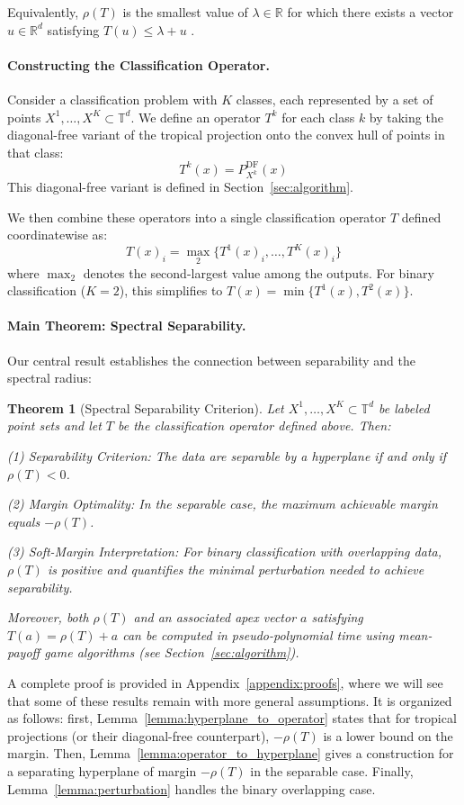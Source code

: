\documentclass{article}
\newtheorem{theorem}{Theorem}
\newcommand{\R}{\mathbb{R}}
\newcommand{\trop}{\mathbb{T}}
\begin{document}
Equivalently, $\rho(T)$ is the smallest value of $\lambda\in \R$ for which there exists a vector $u\in\R^d$
satisfying $T(u) \leq \lambda + u$ \cite{nussbaum1986,AGGut10,akiangaubertqisaadi}.

\paragraph{Constructing the Classification Operator.}
Consider a classification problem with $K$ classes, each represented by a set of points $X^1,\dots,X^K \subset \trop^d$. We define an operator $T^k$ for each class $k$ by taking the diagonal-free variant of the tropical projection onto the convex hull of points in that class:
\[
T^k(x) = P_{X^k}^{\text{DF}}(x)
\]
This diagonal-free variant is defined in Section~\ref{sec:algorithm}.

We then combine these operators into a single classification operator $T$ defined coordinatewise as:
\[
T(x)_i = \operatorname{\max}_2\{T^1(x)_i, \dots, T^K(x)_i\}\label{eq:single_operator}
\]
where $\operatorname{\max}_2$ denotes the second-largest value among the outputs. For binary classification ($K=2$), this simplifies to $T(x)=\min\{T^1(x), T^2(x)\}$.

\paragraph{Main Theorem: Spectral Separability.}
Our central result establishes the connection between separability and the spectral radius:
\begin{theorem}[Spectral Separability Criterion]\label{thm:spectral_separability}
Let $X^1,\ldots,X^K \subset \trop^d$ be labeled point sets and let $T$ be the classification operator defined above. Then:

(1) \textit{Separability Criterion:} The data are separable by a hyperplane if and only if $\rho(T) < 0$.

(2) \textit{Margin Optimality:} In the separable case, the maximum achievable margin equals $-\rho(T)$.

(3) \textit{Soft-Margin Interpretation:} For binary classification with overlapping data, $\rho(T)$ is positive and quantifies the minimal perturbation needed to achieve separability.

Moreover, both $\rho(T)$ and an associated apex vector $a$ satisfying $T(a) = \rho(T)+a$ can be computed in pseudo-polynomial time using mean-payoff game algorithms (see Section~\ref{sec:algorithm}).
\end{theorem}
A complete proof is provided in Appendix~\ref{appendix:proofs}, where we will see that some of these results remain with more general assumptions.
It is organized as follows: first, Lemma~\ref{lemma:hyperplane_to_operator} states that for tropical projections (or their diagonal-free counterpart), $-\rho(T)$ is a lower bound on the margin.
Then, Lemma~\ref{lemma:operator_to_hyperplane} gives a construction for a separating hyperplane of margin $-\rho(T)$ in the separable case. Finally, Lemma~\ref{lemma:perturbation} handles the binary overlapping case.
\end{document}
